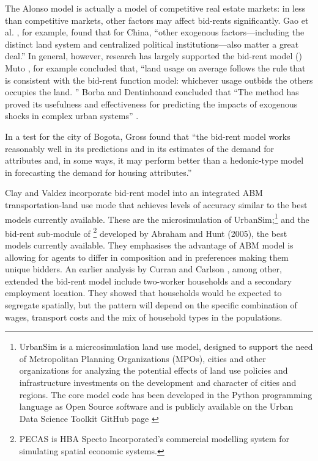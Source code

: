The Alonso model is actually a model of competitive real estate markets: in less than competitive markets, other factors may affect bid-rents significantly. %
Gao et al. \cite{GaoJinlong2020BtbT}, for example,  found  that for China, ``other exogenous  factors---including the distinct land system  and centralized political institutions---also matter a great deal.'' In general, however, 
research has largely supported the bid-rent model (\cite{mutoEstimationBidRent2006, wheatonBidRentApproach1977}) Muto \cite{mutoEstimationBidRent2006}, for example concluded that,  ``land usage on average follows the rule that is consistent with the bid-rent function model: whichever usage outbids the others occupies the land. ''  Borba and Dentinhoand concluded that ``The method has proved its usefulness and effectiveness for predicting the impacts of exogenous shocks in complex urban systems'' \cite{borbaEvaluationUrbanScenarios2016}.  

In a test for the city of Bogota, Gross \cite{grossEstimatingWillingnessPay1988} found that ``the bid-rent model works reasonably well in its predictions and in its estimates of the demand for attributes and, in some ways, it may perform better than a hedonic-type model in forecasting the demand for housing attributes.'' 

Clay and Valdez incorporate bid-rent model into an integrated ABM transportation-land use mode that achieves levels of accuracy similar to the best models currently available. These are the microsimulation of UrbanSim;\footnote{UrbanSim is a micrcosimulation land use model, designed to support the need of Metropolitan Planning Organizations (MPOs), cities and other organizations for analyzing the potential effects of land use policies and infrastructure investments on the development and character of cities and regions. The core model code has been developed in the Python programming language as Open Source software and is publicly available on the Urban Data Science Toolkit GitHub page \cite{waddellmodellinurbandev2002}} and the bid-rent sub-module of \footnote{PECAS is  HBA Specto Incorporated's commercial modelling system  for simulating spatial economic systems.} developed by Abraham and Hunt (2005), the best models currently available. They emphasises the advantage of ABM model is allowing for agents to differ in composition and in preferences making them unique bidders. 
An earlier analysis by Curran and Carlson \cite{curranTheoryResidentialLocation1982}, among other, extended the bid-rent model include two-worker households and a secondary employment location. They showed that households would be expected to segregate spatially, but the pattern will depend on the specific combination of wages, transport costs and the mix of household types in the populations. 


